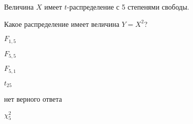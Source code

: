 
\begin{question}
Величина \(X\) имеет \(t\)-распределение с 5 степенями свободы.

Какое распределение имеет величина \(Y = X^2\)?
\begin{answerlist}
  \item \(F_{1, 5}\)
  \item \(F_{5, 5}\)
  \item \(F_{5, 1}\)
  \item \(t_{25}\)
  \item нет верного ответа
  \item \(\chi^2_{5}\)
\end{answerlist}
\end{question}


